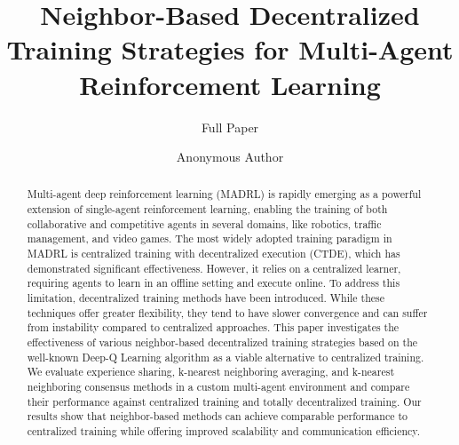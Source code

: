 \documentclass[sigconf]{acmart}
\begin{document}
\title{Neighbor-Based Decentralized Training Strategies for Multi-Agent Reinforcement Learning}
\subtitle{Full Paper}
  
\renewcommand{\shorttitle}{SIG Proceedings Paper in LaTeX Format}





\author{Anonymous Author}
\renewcommand{\shortauthors}{A. Author et al.}

\begin{abstract}
Multi-agent deep reinforcement learning (MADRL) is rapidly emerging as a powerful extension of single-agent reinforcement learning, 
enabling the training of both collaborative and competitive agents in several domains, like robotics, traffic management, and video games.
%
The most widely adopted training paradigm in MADRL is centralized training with decentralized execution (CTDE), which has demonstrated significant effectiveness. 
%
However, it relies on a centralized learner, requiring agents to learn in an offline setting and execute online. To address this limitation, decentralized training methods have been introduced. 
%
While these techniques offer greater flexibility, they tend to have slower convergence and can suffer from instability compared to centralized approaches.
%
This paper investigates the effectiveness of various neighbor-based decentralized training strategies based 
  on the well-known Deep-Q Learning algorithm as a viable alternative to centralized training. 
%  
We evaluate experience sharing, k-nearest neighboring averaging, and k-nearest neighboring consensus methods 
  in a custom multi-agent environment and compare their performance against centralized training
  and totally decentralized training. 
%  
Our results show that neighbor-based methods can achieve comparable performance to centralized training 
  while offering improved scalability and communication efficiency. 
%
\end{abstract}
\end{document}
